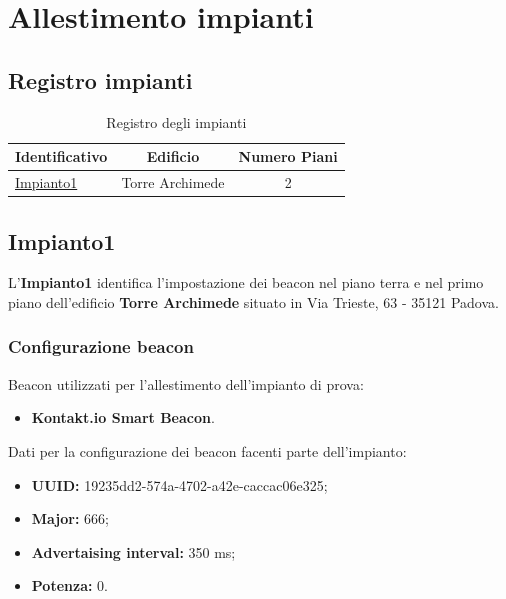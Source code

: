 \documentclass[../SperimentazioniPratiche.tex]{subfiles}
\begin{document}
\section{Allestimento impianti}
\label{sec:AllestimentoImpianto}

	\subsection{Registro impianti}
	
	\begin{table} [h]
		\centering
		\begin{tabular}{lcc}
			\toprule
			\textbf{Identificativo} & \textbf{Edificio} & \textbf{Numero Piani}		\\
			\toprule
			\hyperref[subsec:Impianto1]{Impianto1} & Torre Archimede & 2 \\
			\bottomrule
		\end{tabular}
		\caption{Registro degli impianti}
		\label{tab:RegistroImpianti}
	\end{table}
	
	
	\newpage
	\subsection{Impianto1}
	\label{subsec:Impianto1}
		L'\textbf{Impianto1} identifica l'impostazione dei beacon nel piano terra e nel primo piano dell'edificio \textbf{Torre Archimede} situato in Via Trieste, 63 - 35121 Padova.
		
		\subsubsection{Configurazione beacon}
		Beacon utilizzati per l'allestimento dell'impianto di prova:
		\begin{itemize}
			\item[] \textbf{Kontakt.io Smart Beacon}.
		\end{itemize}
		Dati per la configurazione dei beacon facenti parte dell'impianto:
		\begin{itemize}
			\item[] \textbf{UUID:} 19235dd2-574a-4702-a42e-caccac06e325;
			\item[] \textbf{Major:} 666;
			\item[] \textbf{Advertaising interval:} 350 ms;
			\item[] \textbf{Potenza:} 0.
		\end{itemize}
\end{document}
